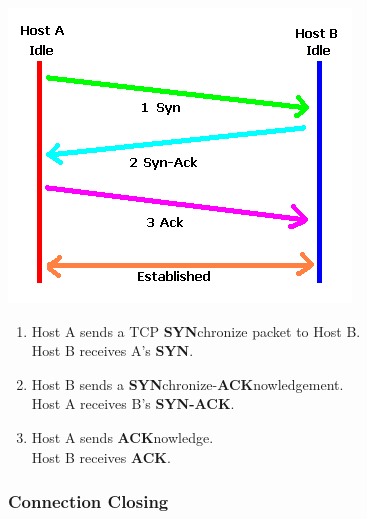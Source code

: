 \begin{minipage}{.4\linewidth}
	\includegraphics[width=\textwidth]{media/3way.png}
\end{minipage}
\begin{minipage}{.6\linewidth}
	\begin{enumerate}
		\item Host A sends a TCP \textbf{SYN}chronize packet to Host B.
		\\ Host B receives A's \textbf{SYN}.
		\item Host B sends a \textbf{SYN}chronize-\textbf{ACK}nowledgement.
		\\ Host A receives B's \textbf{SYN-ACK}.
		\item Host A sends \textbf{ACK}nowledge.
		\\ Host B receives \textbf{ACK}.
	\end{enumerate}
\end{minipage}


\subsubsection{Connection Closing}


